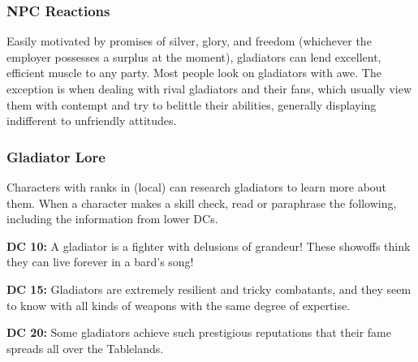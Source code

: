 \subsubsection{NPC Reactions}

Easily motivated by promises of silver, glory, and freedom (whichever the employer possesses a surplus at the moment), gladiators can lend excellent, efficient muscle to any party. Most people look on gladiators with awe. The exception is when dealing with rival gladiators and their fans, which usually view them with contempt and try to belittle their abilities, generally displaying indifferent to unfriendly attitudes.

\subsubsection{Gladiator Lore}

Characters with ranks in  (local) can research gladiators to learn more about them. When a character makes a skill check, read or paraphrase the following, including the information from lower DCs.

\textbf{DC 10:} A gladiator is a fighter with delusions of grandeur! These showoffs think they can live forever in a bard's song!

\textbf{DC 15:} Gladiators are extremely resilient and tricky combatants, and they seem to know with all kinds of weapons with the same degree of expertise.

\textbf{DC 20:} Some gladiators achieve such prestigious reputations that their fame spreads all over the Tablelands.
